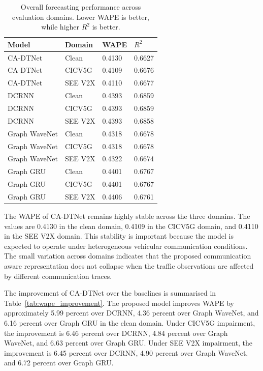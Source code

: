 \documentclass[pdflatex,sn-mathphys-num]{sn-jnl}%
\theoremstyle{thmstyleone}%
\theoremstyle{thmstyletwo}%
\theoremstyle{thmstylethree}%
\begin{document}
\begin{table}[t]
\centering
\caption{Overall forecasting performance across evaluation domains. Lower WAPE is better, while higher \(R^{2}\) is better.}
\label{tab:overall_wape_r2}
\small
\begin{tabular}{p{3.1cm} p{2.5cm} p{2.2cm} p{2.2cm}}
\hline
Model & Domain & WAPE & \(R^{2}\) \\
\hline
CA-DTNet & Clean & 0.4130 & 0.6627 \\
CA-DTNet & CICV5G & 0.4109 & 0.6676 \\
CA-DTNet & SEE V2X & 0.4110 & 0.6677 \\
DCRNN & Clean & 0.4393 & 0.6859 \\
DCRNN & CICV5G & 0.4393 & 0.6859 \\
DCRNN & SEE V2X & 0.4393 & 0.6858 \\
Graph WaveNet & Clean & 0.4318 & 0.6678 \\
Graph WaveNet & CICV5G & 0.4318 & 0.6678 \\
Graph WaveNet & SEE V2X & 0.4322 & 0.6674 \\
Graph GRU & Clean & 0.4401 & 0.6767 \\
Graph GRU & CICV5G & 0.4401 & 0.6767 \\
Graph GRU & SEE V2X & 0.4406 & 0.6761 \\
\hline
\end{tabular}
\end{table}

The WAPE of CA-DTNet remains highly stable across the three domains. The values are 0.4130 in the clean domain, 0.4109 in the CICV5G domain, and 0.4110 in the SEE V2X domain. This stability is important because the model is expected to operate under heterogeneous vehicular communication conditions. The small variation across domains indicates that the proposed communication aware representation does not collapse when the traffic observations are affected by different communication traces.

The improvement of CA-DTNet over the baselines is summarised in Table~\ref{tab:wape_improvement}. The proposed model improves WAPE by approximately 5.99 percent over DCRNN, 4.36 percent over Graph WaveNet, and 6.16 percent over Graph GRU in the clean domain. Under CICV5G impairment, the improvement is 6.46 percent over DCRNN, 4.84 percent over Graph WaveNet, and 6.63 percent over Graph GRU. Under SEE V2X impairment, the improvement is 6.45 percent over DCRNN, 4.90 percent over Graph WaveNet, and 6.72 percent over Graph GRU.
\end{document}
